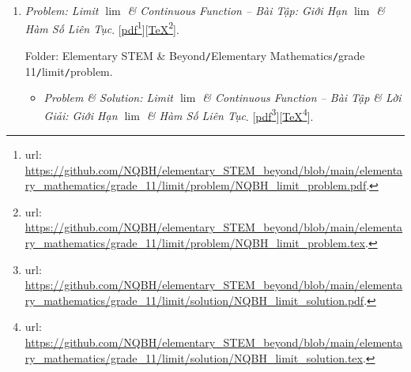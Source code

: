 \documentclass[12pt,twoside]{book}
\begin{document}
\begin{enumerate}
	Folder: {\sf Elementary STEM \& Beyond{\tt/}Elementary Mathematics{\tt/}grade 11{\tt/}progression{\tt/}problem}.
	\begin{itemize}
		\item {\it Problem \& Solution: Arithmetic \& Geometric Progressions -- Bài Tập \& Lời Giải: Cấp Số Cộng \& Cấp Số Nhân}. [\href{https://github.com/NQBH/elementary_STEM_beyond/blob/main/elementary_mathematics/grade_11/progression/solution/NQBH_progression_solution.pdf}{pdf}\footnote{{\sc url}: \url{https://github.com/NQBH/elementary_STEM_beyond/blob/main/elementary_mathematics/grade_11/progression/solution/NQBH_progression_solution.pdf}.}][\href{https://github.com/NQBH/elementary_STEM_beyond/blob/main/elementary_mathematics/grade_11/progression/solution/NQBH_progression_solution.tex}{\TeX}\footnote{{\sc url}: \url{https://github.com/NQBH/elementary_STEM_beyond/blob/main/elementary_mathematics/grade_11/progression/solution/NQBH_progression_solution.tex}.}].
		
		Folder: {\sf Elementary STEM \& Beyond{\tt/}Elementary Mathematics{\tt/}grade 11{\tt/}progression{\tt/}solution}.
	\end{itemize}
	\item {\it Problem: Limit $\lim$ \& Continuous Function -- Bài Tập: Giới Hạn $\lim$ \& Hàm Số Liên Tục}. [\href{https://github.com/NQBH/elementary_STEM_beyond/blob/main/elementary_mathematics/grade_11/limit/problem/NQBH_limit_problem.pdf}{pdf}\footnote{{\sc url}: \url{https://github.com/NQBH/elementary_STEM_beyond/blob/main/elementary_mathematics/grade_11/limit/problem/NQBH_limit_problem.pdf}.}][\href{https://github.com/NQBH/elementary_STEM_beyond/blob/main/elementary_mathematics/grade_11/limit/problem/NQBH_limit_problem.tex}{\TeX}\footnote{{\sc url}: \url{https://github.com/NQBH/elementary_STEM_beyond/blob/main/elementary_mathematics/grade_11/limit/problem/NQBH_limit_problem.tex}.}].
	
	Folder: {\sf Elementary STEM \& Beyond{\tt/}Elementary Mathematics{\tt/}grade 11{\tt/}limit{\tt/}problem}.
	\begin{itemize}
		\item {\it Problem \& Solution: Limit $\lim$ \& Continuous Function -- Bài Tập \& Lời Giải: Giới Hạn $\lim$ \& Hàm Số Liên Tục}. [\href{https://github.com/NQBH/elementary_STEM_beyond/blob/main/elementary_mathematics/grade_11/limit/solution/NQBH_limit_solution.pdf}{pdf}\footnote{{\sc url}: \url{https://github.com/NQBH/elementary_STEM_beyond/blob/main/elementary_mathematics/grade_11/limit/solution/NQBH_limit_solution.pdf}.}][\href{https://github.com/NQBH/elementary_STEM_beyond/blob/main/elementary_mathematics/grade_11/limit/solution/NQBH_limit_solution.tex}{\TeX}\footnote{{\sc url}: \url{https://github.com/NQBH/elementary_STEM_beyond/blob/main/elementary_mathematics/grade_11/limit/solution/NQBH_limit_solution.tex}.}].
		

\end{itemize}
\end{enumerate}
\end{document}
